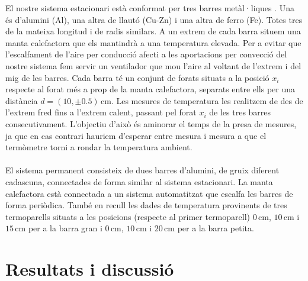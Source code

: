 \documentclass[12pt,twosides,onecolumn,openany]{article}
\begin{document}
\begin{multicols}{2}
El nostre sistema estacionari està conformat per tres barres metàl·liques \cite{guia_lab}. Una és d'alumini (Al), una altra de llautó (Cu-Zn) i una altra de ferro (Fe). Totes tres de la mateixa longitud i de radis similars. A un extrem de cada barra situem una manta calefactora que els mantindrà a una temperatura elevada. Per a evitar que l'escalfament de l'aire per conducció afecti a les aportacions per convecció del nostre sistema fem servir un ventilador que mou l'aire al voltant de l'extrem i del mig de les barres. Cada barra té un conjunt de forats situats a la posició $x_i$ respecte al forat més a prop de la manta calefactora, separats entre ells per una distància \(d = (10,\pm0.5)\, \text{cm}\). Les mesures de temperatura les realitzem de des de l'extrem fred fins a l'extrem calent, passant pel forat $x_i$ de les tres barres consecutivament. L'objectiu d'això és aminorar el temps de la presa de mesures, ja que en cas contrari hauriem d'esperar entre mesura i mesura a que el termòmetre torni a rondar la temperatura ambient.\\\\
El sistema permanent consisteix de dues barres d'alumini, de gruix diferent cadascuna, connectades de forma similar al sistema estacionari. La manta calefactora està connectada a un sistema automatitzat que escalfa les barres de forma periòdica. També en recull les dades de temperatura provinents de tres termoparells situats a les posicions (respecte al primer termoparell) \(0\,\text{cm}\), \(10\,\text{cm}\) i \(15\,\text{cm}\) per a la barra gran i \(0\,\text{cm}\), \(10\,\text{cm}\) i \(20\,\text{cm}\) per a la barra petita. 
\section{Resultats i discussió}

\end{multicols}
\end{document}
